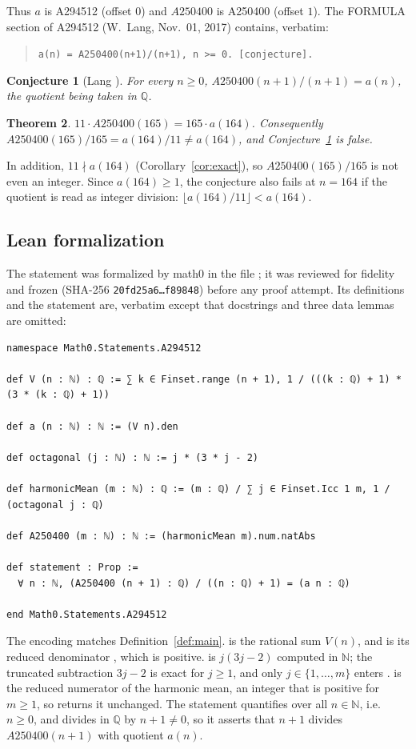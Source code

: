 \documentclass[11pt]{amsart}
\theoremstyle{plain}
\newtheorem{theorem}{Theorem}
\newtheorem{conjecture}[theorem]{Conjecture}
\theoremstyle{definition}
\newcommand{\N}{\mathbb{N}}
\newcommand{\Q}{\mathbb{Q}}
\begin{document}
Thus $a$ is A294512 (offset $0$) and $A250400$ is A250400 (offset $1$). The FORMULA section of A294512 (W.~Lang, Nov.~01, 2017) contains, verbatim:
\begin{quote}
\texttt{a(n) = A250400(n+1)/(n+1), n >= 0. [conjecture].}
\end{quote}

\begin{conjecture}[Lang \cite{A294512}]\label{conj}
For every $n\ge 0$, $A250400(n+1)/(n+1)=a(n)$, the quotient being taken in $\Q$.
\end{conjecture}

\begin{theorem}\label{thm:main}
$11\cdot A250400(165)=165\cdot a(164)$. Consequently $A250400(165)/165=a(164)/11\ne a(164)$, and Conjecture~\ref{conj} is false.
\end{theorem}

In addition, $11\nmid a(164)$ (Corollary~\ref{cor:exact}), so $A250400(165)/165$ is not even an integer. Since $a(164)\ge1$, the conjecture also fails at $n=164$ if the quotient is read as integer division: $\lfloor a(164)/11\rfloor<a(164)$.

\subsection*{Lean formalization}
The statement was formalized by math0 in the file ; it was reviewed for fidelity and frozen (SHA-256 \texttt{20fd25a6\ldots f89848}) before any proof attempt. Its definitions and the statement are, verbatim except that docstrings and three data lemmas are omitted:
\begin{lstlisting}
namespace Math0.Statements.A294512

def V (n : ℕ) : ℚ := ∑ k ∈ Finset.range (n + 1), 1 / (((k : ℚ) + 1) * (3 * (k : ℚ) + 1))

def a (n : ℕ) : ℕ := (V n).den

def octagonal (j : ℕ) : ℕ := j * (3 * j - 2)

def harmonicMean (m : ℕ) : ℚ := (m : ℚ) / ∑ j ∈ Finset.Icc 1 m, 1 / (octagonal j : ℚ)

def A250400 (m : ℕ) : ℕ := (harmonicMean m).num.natAbs

def statement : Prop :=
  ∀ n : ℕ, (A250400 (n + 1) : ℚ) / ((n : ℚ) + 1) = (a n : ℚ)

end Math0.Statements.A294512
\end{lstlisting}
The encoding matches Definition~\ref{def:main}.
 is the rational sum $V(n)$, and  is its reduced denominator , which is positive.
 is $j(3j-2)$ computed in $\N$; the truncated subtraction $3j-2$ is exact for $j\ge1$, and only $j\in\{1,\dots,m\}$ enters .
 is the reduced numerator  of the harmonic mean, an integer that is positive for $m\ge1$, so  returns it unchanged.
The statement quantifies over all $n\in\N$, i.e.\ $n\ge0$, and divides in $\Q$ by $n+1\ne0$, so it asserts that $n+1$ divides $A250400(n+1)$ with quotient $a(n)$.
\end{document}
